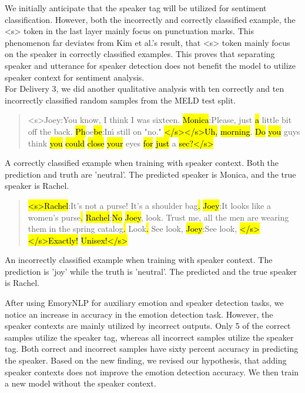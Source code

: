 \documentclass[11pt]{article}
\begin{document}
We initially anticipate that the speaker tag will be utilized for sentiment classification. However, both the incorrectly and correctly classified example, the <s> token in the last layer mainly focus on punctuation marks. This phenomenon far deviates from Kim et al.'s result, that <s> token mainly focus on the speaker in correctly classified examples. This proves that separating speaker and utterance for speaker detection does not benefit the model to utilize speaker context for sentiment analysis.\\

For Delivery 3, we did another qualitative analysis with ten correctly and ten incorrectly classified random samples from the MELD test split.

{\small
\begin{quote}

<s>Joey:You know, I think I was sixteen. \hl{Monica}:Please, just \hl{a} little bit off the back. \hl{Ph}oe\hl{be}:I\'m still on "no." \hl{</s></s>Uh,} \hl{morning}. \hl{Do} \hl{you} guys think \hl{you} \hl{could} \hl{close} \hl{your} eyes \hl{for} \hl{just} a \hl{sec}\hl{?</s>}

\end{quote}

A correctly classified example when training with speaker context. Both the prediction and truth are 'neutral'. The predicted speaker is Monica, and the true speaker is Rachel.

\begin{quote}

\hl{<s>}\hl{Rachel}:It's not a purse! It's a shoulder bag\hl{.} \hl{Joey}:It looks like a women's purse\hl{.} \hl{Rachel}:\hl{No} \hl{Joey}, look. Trust me, all the men are wearing them in the spring catalog\hl{.} Look\hl{.} See look, \hl{Joey}:See look, \hl{</s></s>Exactly!} \hl{Unisex!</s>}

\end{quote}

An incorrectly classified example when training with speaker context. The prediction is 'joy' while the truth is 'neutral'. The predicted and the true speaker is Rachel.}

After using EmoryNLP for auxiliary emotion and speaker detection tasks, we notice an increase in accuracy in the emotion detection task. However, the speaker contexts are mainly utilized by incorrect outputs. Only 5 of the correct samples utilize the speaker tag, whereas all incorrect samples utilize the speaker tag. Both correct and incorrect samples have sixty percent accuracy in predicting the speaker. Based on the new finding, we revised our hypothesis, that adding speaker contexts does not improve the emotion detection accuracy. We then train a new model without the speaker context.
\end{document}
